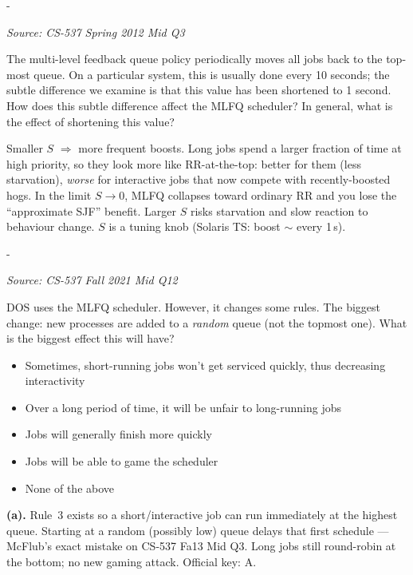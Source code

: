 \documentclass[11pt,a4paper]{article}
\makeatletter
\newcommand{\keepspace}[1]{\par\penalty-100\begingroup
  \setlength{\dimen@}{#1}\dimen@ii\pagegoal\advance\dimen@ii-\pagetotal
  \ifdim\dimen@>\dimen@ii\ifdim\dimen@ii>\z@\vfil\fi\break\fi\endgroup}
\newcounter{qn}[section]
\newenvironment{Qn}[4]{%
  \refstepcounter{qn}\keepspace{7\baselineskip}%
  \begin{tcolorbox}[qboxstyle, title={Q\thesection.\theqn\ \ [#1 \textbar\ #2]\ \ #4}]%
  {\footnotesize\color{g3}\textit{Source: #3}}\par\smallskip%
}{%
  \end{tcolorbox}%
}
\newenvironment{Sol}{%
  \begin{tcolorbox}[sboxstyle, title={Solution}]%
}{%
  \end{tcolorbox}\vspace{0.35em}%
}
\makeatother
\begin{document}
\begin{Qn}{Medium}{Lect 7}{CS-537 Spring 2012 Mid Q3}{Boost period $S$: 10\,s vs.\ 1\,s}
The multi-level feedback queue policy periodically moves all jobs back to the top-most queue. On a particular system, this is usually done every 10 seconds; the subtle difference we examine is that this value has been shortened to 1 second. How does this subtle difference affect the MLFQ scheduler? In general, what is the effect of shortening this value?
\end{Qn}
\begin{Sol}
Smaller $S$ $\Rightarrow$ more frequent boosts. Long jobs spend a larger fraction of time at high priority, so they look more like RR-at-the-top: better for them (less starvation), \emph{worse} for interactive jobs that now compete with recently-boosted hogs. In the limit $S\to 0$, MLFQ collapses toward ordinary RR and you lose the ``approximate SJF'' benefit. Larger $S$ risks starvation and slow reaction to behaviour change. $S$ is a tuning knob (Solaris TS: boost $\sim$ every 1\,s).
\end{Sol}

\begin{Qn}{Medium}{Lect 7}{CS-537 Fall 2021 Mid Q12}{MLFQ that inserts new jobs in a random queue}
DOS uses the MLFQ scheduler. However, it changes some rules. The biggest change: new processes are added to a \emph{random} queue (not the topmost one). What is the biggest effect this will have?
\begin{itemize}
  \item[(a)] Sometimes, short-running jobs won't get serviced quickly, thus decreasing interactivity
  \item[(b)] Over a long period of time, it will be unfair to long-running jobs
  \item[(c)] Jobs will generally finish more quickly
  \item[(d)] Jobs will be able to game the scheduler
  \item[(e)] None of the above
\end{itemize}
\end{Qn}
\begin{Sol}
\textbf{(a).} Rule~3 exists so a short/interactive job can run immediately at the highest queue. Starting at a random (possibly low) queue delays that first schedule --- McFlub's exact mistake on CS-537 Fa13 Mid Q3. Long jobs still round-robin at the bottom; no new gaming attack. Official key: A.
\end{Sol}
\end{document}
